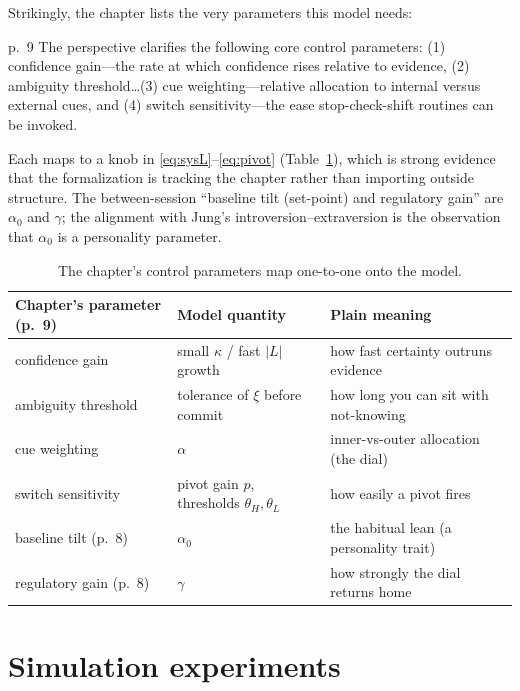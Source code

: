 \documentclass[11pt]{article}
\begin{document}
Strikingly, the chapter lists the very parameters this model needs:

\begin{fromtext}{p.~9}
The perspective clarifies the following core control parameters: (1) confidence gain---the rate at which confidence rises relative to evidence, (2) ambiguity threshold\dots (3) cue weighting---relative allocation to internal versus external cues, and (4) switch sensitivity---the ease stop-check-shift routines can be invoked.
\end{fromtext}

\noindent Each maps to a knob in \eqref{eq:sysL}--\eqref{eq:pivot} (Table~\ref{tab:params}), which is strong evidence that the formalization is tracking the chapter rather than importing outside structure. The between-session ``baseline tilt (set-point) and regulatory gain'' \citep[p.~8]{HanEtAL2025} are $\alpha_0$ and $\gamma$; the alignment with Jung's introversion--extraversion \citep[p.~8]{HanEtAL2025} is the observation that $\alpha_0$ is a personality parameter.

\begin{table}[h]
\centering\small
\caption{The chapter's control parameters \citep[p.~9]{HanEtAL2025} map one-to-one onto the model.}
\label{tab:params}
\begin{tabular}{@{}lll@{}}
\toprule
Chapter's parameter (p.~9) & Model quantity & Plain meaning\\
\midrule
confidence gain & small $\kappa$ / fast $|L|$ growth & how fast certainty outruns evidence\\
ambiguity threshold & tolerance of $\xi$ before commit & how long you can sit with not-knowing\\
cue weighting & $\alpha$ & inner-vs-outer allocation (the dial)\\
switch sensitivity & pivot gain $p$, thresholds $\theta_H,\theta_L$ & how easily a pivot fires\\
baseline tilt (p.~8) & $\alpha_0$ & the habitual lean (a personality trait)\\
regulatory gain (p.~8) & $\gamma$ & how strongly the dial returns home\\
\bottomrule
\end{tabular}
\end{table}

\section{Simulation experiments}
\label{sec:exp}
\end{document}

